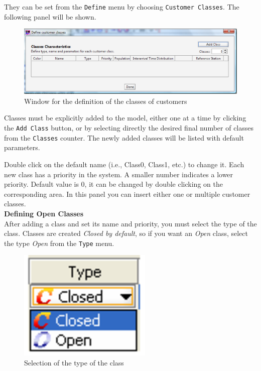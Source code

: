 They can be set from the \texttt{Define} menu by choosing
\texttt{Customer Classes}. The following panel will be shown.

\begin{figure}[htb]
    \begin{center}
        \includegraphics[scale=.5]{img/jsimg/3.1.eps}
    \end{center}
    \caption{Window for the definition of the classes of customers}
    \label{fig:jsimg:defclwin}
\end{figure}

Classes must be explicitly added to the model, either one at a
time by clicking the \texttt{Add Class} button, or by selecting
directly the desired final number of classes from the
\texttt{Classes} counter. The newly added classes will be listed
with default parameters.

Double click on the default name (i.e., Class0, Class1, etc.) to
change it. Each new class has a priority in the system. A smaller
number indicates a lower priority. Default value is 0, it can be
changed by double clicking on the corresponding area. In this
panel you can insert either one or multiple
customer classes.\\

\textbf{Defining Open Classes}\\
After adding a class and set its name and priority, you must
select the type of the class. Classes are created \emph{Closed by
default}, so if you want an \emph{Open} class, select the type
\emph{Open} from the \texttt{Type} menu.
\begin{figure}[htb]
    \begin{center}
        \includegraphics[scale=.5]{img/jsimg/3.2.eps}
    \end{center}
    \caption{Selection of the type of the class}
    \label{fig:typeclass}
\end{figure}

